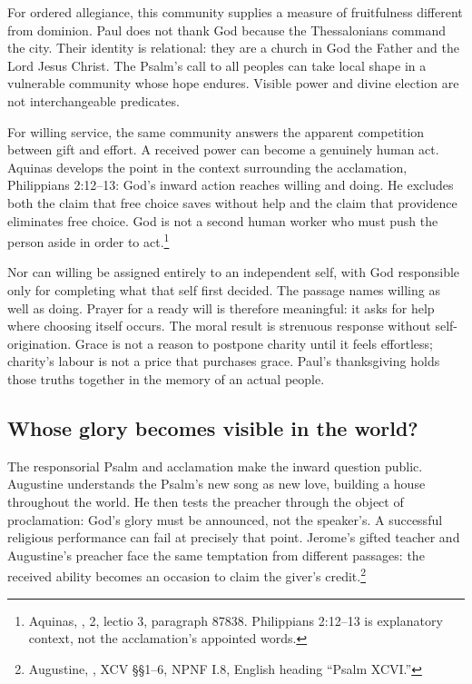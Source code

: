 For ordered allegiance, this community supplies a measure of fruitfulness different from dominion. Paul does not thank God because the Thessalonians command the city. Their identity is relational: they are a church in God the Father and the Lord Jesus Christ. The Psalm's call to all peoples can take local shape in a vulnerable community whose hope endures. Visible power and divine election are not interchangeable predicates.

For willing service, the same community answers the apparent competition between gift and effort. A received power can become a genuinely human act. Aquinas develops the point in the context surrounding the acclamation, Philippians 2:12--13: God's inward action reaches willing and doing. He excludes both the claim that free choice saves without help and the claim that providence eliminates free choice. God is not a second human worker who must push the person aside in order to act.\footnote{Aquinas, , 2, lectio 3, paragraph 87838. Philippians 2:12--13 is explanatory context, not the acclamation's appointed words.}

Nor can willing be assigned entirely to an independent self, with God responsible only for completing what that self first decided. The passage names willing as well as doing. Prayer for a ready will is therefore meaningful: it asks for help where choosing itself occurs. The moral result is strenuous response without self-origination. Grace is not a reason to postpone charity until it feels effortless; charity's labour is not a price that purchases grace. Paul's thanksgiving holds those truths together in the memory of an actual people.

\subsection{Whose glory becomes visible in the world?}
The responsorial Psalm and acclamation make the inward question public. Augustine understands the Psalm's new song as new love, building a house throughout the world. He then tests the preacher through the object of proclamation: God's glory must be announced, not the speaker's. A successful religious performance can fail at precisely that point. Jerome's gifted teacher and Augustine's preacher face the same temptation from different passages: the received ability becomes an occasion to claim the giver's credit.\footnote{Augustine, , XCV §§1--6, NPNF I.8, English heading ``Psalm XCVI.''}

